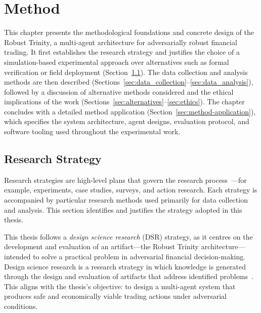 \chapter{Method} \label{cha:method}

This chapter presents the methodological foundations and concrete design of the
Robust Trinity, a multi-agent architecture for adversarially robust financial
trading. It first establishes the research strategy and justifies the choice of
a simulation-based experimental approach over alternatives such as formal
verification or field deployment (Section~\ref{sec:research_strategy}). The data
collection and analysis methods are then described
(Sections~\ref{sec:data_collection}--\ref{sec:data_analysis}), followed by a
discussion of alternative methods considered and the ethical implications of the
work (Sections~\ref{sec:alternatives}--\ref{sec:ethics}).
The chapter concludes with a detailed method application
(Section~\ref{sec:method-application}), which specifies the system architecture,
agent designs, evaluation protocol, and software tooling used throughout the
experimental work.


\section{Research Strategy} \label{sec:research_strategy}

Research strategies are high-level plans that govern the research process~\cite{johannesson2014design}---for example, experiments, case studies, surveys,
and action research. Each strategy is accompanied by particular research methods
used primarily for data collection and analysis. This section identifies and
justifies the strategy adopted in this thesis.

This thesis follows a \textit{design science research} (DSR) strategy, as it
centres on the development and evaluation of an artifact---the Robust Trinity
architecture---intended to solve a practical problem in adversarial financial
decision-making. Design science research is a research strategy in which
knowledge is generated through the design and evaluation of artifacts that
address identified problems~\cite{johannesson2014design, articlehevner}. This
aligns with the thesis's objective: to design a multi-agent system that produces
safe and economically viable trading actions under adversarial conditions.

